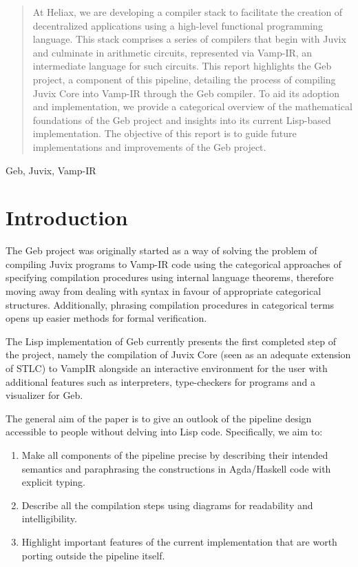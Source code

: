 



\begin{abstract}
At Heliax, we are developing a compiler stack to facilitate the creation
of decentralized applications using a high-level functional programming
language. This stack comprises a series of compilers that begin with
Juvix and culminate in arithmetic circuits, represented via Vamp-IR, an
intermediate language for such circuits. This report highlights the Geb
project, a component of this pipeline, detailing the process of compiling
Juvix Core into Vamp-IR through the Geb compiler. To aid its adoption and
implementation, we provide a categorical overview of the mathematical
foundations of the Geb project and insights into its current Lisp-based
implementation. The objective of this report is to guide future
implementations and improvements of the Geb project.
\end{abstract}


\begin{keywords}
Geb, Juvix, Vamp-IR
\end{keywords}
\maketitle
\section{Introduction}

The Geb project was originally started as a way of solving the problem of compiling Juvix programs to Vamp-IR code using the categorical approaches of specifying compilation procedures using internal language theorems, therefore moving away from dealing with syntax in favour of appropriate categorical structures. Additionally, phrasing compilation procedures in categorical terms opens up easier methods for formal verification.

The Lisp implementation of Geb currently presents the first completed step of the project, namely the compilation of Juvix Core (seen as an adequate extension of STLC) to VampIR alongside an interactive environment for the user with additional features such as interpreters, type-checkers for programs and a visualizer for Geb.

The general aim of the paper is to give an outlook of the pipeline design accessible to people without delving into Lisp code. Specifically, we aim to:

\begin{enumerate}
\item Make all components of the pipeline precise by describing their
intended semantics and paraphrasing the constructions in Agda/Haskell code
with explicit typing.
\item Describe all the compilation steps using diagrams for readability and
intelligibility.
\item  Highlight important features of the current implementation that are
worth porting outside the pipeline itself.
\end{enumerate}

